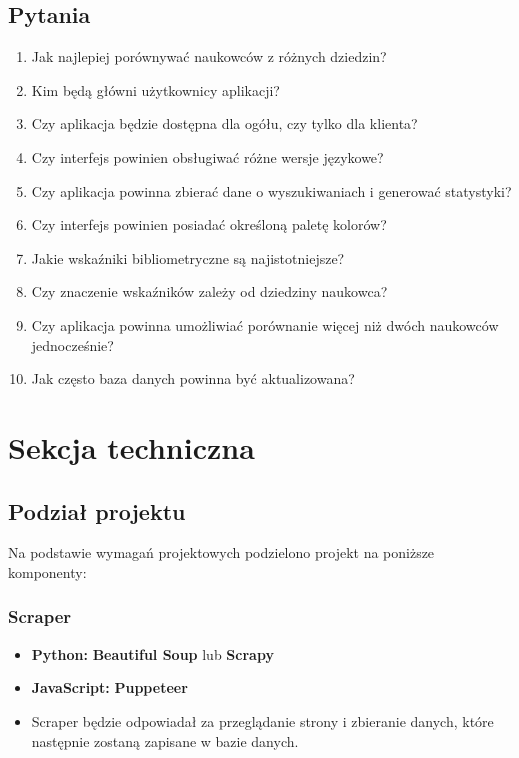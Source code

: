 \documentclass{article}
\begin{document}
\subsection{Pytania}
\begin{enumerate}
  \item Jak najlepiej porównywać naukowców z różnych dziedzin?
  \item Kim będą główni użytkownicy aplikacji?
  \item Czy aplikacja będzie dostępna dla ogółu, czy tylko dla klienta?
  \item Czy interfejs powinien obsługiwać różne wersje językowe?
  \item Czy aplikacja powinna zbierać dane o wyszukiwaniach i generować statystyki?
  \item Czy interfejs powinien posiadać określoną paletę kolorów?
  \item Jakie wskaźniki bibliometryczne są najistotniejsze?
  \item Czy znaczenie wskaźników zależy od dziedziny naukowca?
  \item Czy aplikacja powinna umożliwiać porównanie więcej niż dwóch naukowców jednocześnie?
  \item Jak często baza danych powinna być aktualizowana?
\end{enumerate}

\section{Sekcja techniczna}
\subsection{Podział projektu}
Na podstawie wymagań projektowych podzielono projekt na poniższe komponenty:

\subsubsection{Scraper}
\begin{itemize}
  \item \textbf{Python:} \textbf{Beautiful Soup} lub \textbf{Scrapy}
  \item \textbf{JavaScript:} \textbf{Puppeteer}
  \item Scraper będzie odpowiadał za przeglądanie strony i zbieranie danych, które następnie zostaną zapisane w bazie danych.
\end{itemize}
\end{document}
